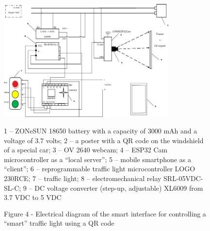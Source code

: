 \begin{figure}[H]
	\centering
	\includegraphics[width=0.8\textwidth]{assets/77}
	\caption*{1 -- ZONeSUN 18650 battery with a capacity of 3000 mAh and a
voltage of 3.7 volts; 2 -- a poster with a QR code on the windshield of
a special car; 3 -- OV 2640 webcam; 4 -- ESP32 Cam microcontroller as a
``local server''; 5 -- mobile smartphone as a ``client''; 6 --
reprogrammable traffic light microcontroller LOGO 230RCE; 7 -- traffic
light; 8 -- electromechanical relay SRL-05VDC-SL-C; 9 -- DC voltage
converter (step-up, adjustable) XL6009 from 3.7 VDC to 5 VDC}
	\caption*{Figure 4 - Electrical diagram of the smart interface for controlling a ``smart'' traffic light using a QR code}
\end{figure}

